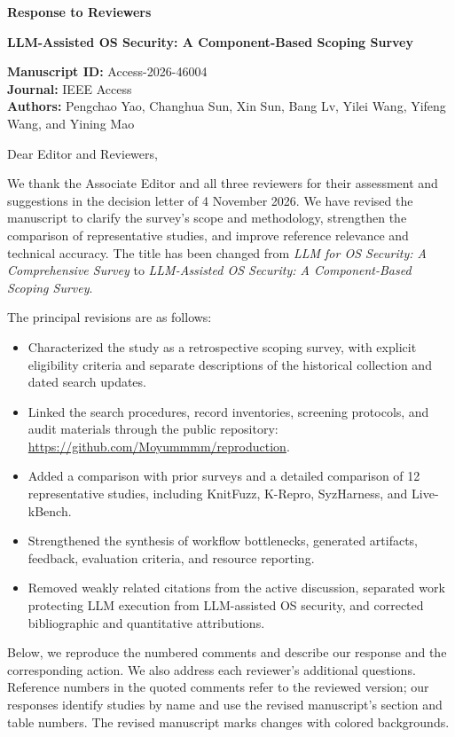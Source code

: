 \documentclass[11pt,a4paper]{article}
\newcommand{\repo}{\url{https://github.com/Moyummmm/reproduction}}
\begin{document}
\begin{center}
{\LARGE\bfseries Response to Reviewers\par}
\vspace{7pt}
{\large\bfseries LLM-Assisted OS Security: A Component-Based Scoping Survey\par}
\end{center}
\vspace{-7pt}
\textbf{Manuscript ID:} Access-2026-46004\\
\textbf{Journal:} IEEE Access\\
\textbf{Authors:} Pengchao Yao, Changhua Sun, Xin Sun, Bang Lv, Yilei Wang, Yifeng Wang, and Yining Mao

Dear Editor and Reviewers,

We thank the Associate Editor and all three reviewers for their assessment and suggestions in the decision letter of 4 November 2026. We have revised the manuscript to clarify the survey's scope and methodology, strengthen the comparison of representative studies, and improve reference relevance and technical accuracy. The title has been changed from \emph{LLM for OS Security: A Comprehensive Survey} to \emph{LLM-Assisted OS Security: A Component-Based Scoping Survey}.

The principal revisions are as follows:
\begin{itemize}
\item Characterized the study as a retrospective scoping survey, with explicit eligibility criteria and separate descriptions of the historical collection and dated search updates.
\item Linked the search procedures, record inventories, screening protocols, and audit materials through the public repository: \repo.
\item Added a comparison with prior surveys and a detailed comparison of 12 representative studies, including KnitFuzz, K-Repro, SyzHarness, and Live-kBench.
\item Strengthened the synthesis of workflow bottlenecks, generated artifacts, feedback, evaluation criteria, and resource reporting.
\item Removed weakly related citations from the active discussion, separated work protecting LLM execution from LLM-assisted OS security, and corrected bibliographic and quantitative attributions.
\end{itemize}

Below, we reproduce the numbered comments and describe our response and the corresponding action. We also address each reviewer's additional questions. Reference numbers in the quoted comments refer to the reviewed version; our responses identify studies by name and use the revised manuscript's section and table numbers. The revised manuscript marks changes with colored backgrounds.
\end{document}
